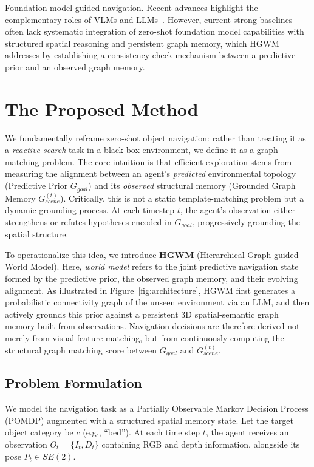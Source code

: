 \documentclass{article}
\begin{document}
Foundation model guided navigation. Recent advances highlight the complementary roles of VLMs and LLMs~\citep{nie2025wmnav}. However, current strong baselines often lack systematic integration of zero-shot foundation model capabilities with structured spatial reasoning and persistent graph memory, which HGWM addresses by establishing a consistency-check mechanism between a predictive prior and an observed graph memory.

\section{The Proposed Method}

We fundamentally reframe zero-shot object navigation: rather than treating it as a \textit{reactive search} task in a black-box environment, we define it as a graph matching problem. The core intuition is that efficient exploration stems from measuring the alignment between an agent's \textit{predicted} environmental topology (Predictive Prior $G_{goal}$) and its \textit{observed} structural memory (Grounded Graph Memory $G_{scene}^{(t)}$). Critically, this is not a static template-matching problem but a dynamic grounding process. At each timestep $t$, the agent's observation either strengthens or refutes hypotheses encoded in $G_{goal}$, progressively grounding the spatial structure.

To operationalize this idea, we introduce \textbf{HGWM} (Hierarchical Graph-guided World Model). Here, \textit{world model} refers to the joint predictive navigation state formed by the predictive prior, the observed graph memory, and their evolving alignment. As illustrated in Figure~\ref{fig:architecture}, HGWM first generates a probabilistic connectivity graph of the unseen environment via an LLM, and then actively grounds this prior against a persistent 3D spatial-semantic graph memory built from observations. Navigation decisions are therefore derived not merely from visual feature matching, but from continuously computing the structural graph matching score between $G_{goal}$ and $G_{scene}^{(t)}$.

\subsection{Problem Formulation}

We model the navigation task as a Partially Observable Markov Decision Process (POMDP) augmented with a structured spatial memory state. Let the target object category be $c$ (e.g., ``bed''). At each time step $t$, the agent receives an observation $O_t = \{I_t, D_t\}$ containing RGB and depth information, alongside its pose $P_t \in SE(2)$.
\end{document}
